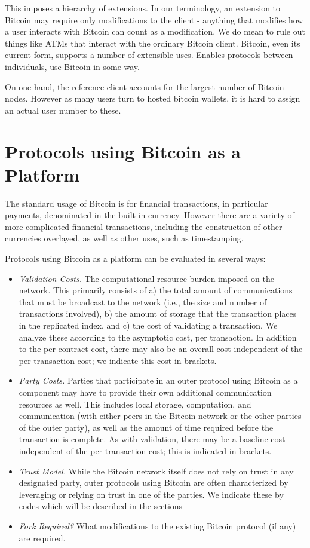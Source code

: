 This imposes a hierarchy of extensions. In our terminology, an extension to Bitcoin may require only modifications to the client - anything that modifies how a user interacts with Bitcoin can count as a modification. We do mean to rule out things like ATMs that interact with the ordinary Bitcoin client. Bitcoin, even its current form, supports a number of extensible uses. Enables protocols between individuals, use Bitcoin in some way.

On one hand, the reference client accounts for the largest number of Bitcoin nodes. However as many users turn to hosted bitcoin wallets, it is hard to assign an actual user number to these.



\section{ Protocols using Bitcoin as a Platform }

The standard usage of Bitcoin is for financial transactions, in particular payments, denominated in the built-in currency. However there are a variety of more complicated financial transactions, including the construction of other currencies overlayed, as well as other uses, such as timestamping.

Protocols using Bitcoin as a platform can be evaluated in several ways:
\begin{itemize}
\item {\em Validation Costs.} The computational resource burden imposed on the network. This primarily consists of a) the total amount of communications that must be broadcast to the network (i.e., the size and number of transactions involved), b) the amount of storage that the transaction places in the replicated index, and c) the cost of validating a transaction. We analyze these according to the asymptotic cost, per transaction. In addition to the per-contract cost, there may also be an overall cost independent of the per-transaction cost; we indicate this cost in brackets.

\item {\em Party Costs.} Parties that participate in an outer protocol using Bitcoin as a component may have to provide their own additional communication resources as well. This includes local storage, computation, and communication (with either peers in the Bitcoin network or the other parties of the outer party), as well as the amount of time required before the transaction is complete. As with validation, there may be a baseline cost independent of the per-transaction cost; this is indicated in brackets.

\item {\em Trust Model.} While the Bitcoin network itself does not rely on trust in any designated party, outer protocols using Bitcoin are often characterized by leveraging or relying on trust in one of the parties. We indicate these by codes which will be described in the sections 

\item {\em Fork Required?} What modifications to the existing Bitcoin protocol (if any) are required.
\end{itemize}

